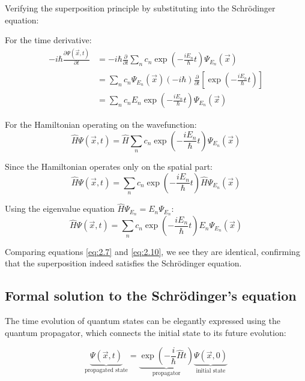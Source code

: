 \documentclass[italian]{HKNdocument}
\begin{document}
Verifying the superposition principle by substituting into the Schrödinger equation:

For the time derivative:
\begin{align}
-i\hbar\frac{\partial\Psi(\vec{x},t)}{\partial t} &= -i\hbar\frac{\partial}{\partial t}\sum_n c_n\exp\left(-\frac{iE_n}{\hbar}t\right)\Psi_{E_n}(\vec{x}) \\
&= \sum_n c_n\Psi_{E_n}(\vec{x})(-i\hbar)\frac{\partial}{\partial t}\left[\exp\left(-\frac{iE_n}{\hbar}t\right)\right] \label{eq:2.7} \\
&= \sum_n c_nE_n\exp\left(-\frac{iE_n}{\hbar}t\right)\Psi_{E_n}(\vec{x})
\end{align}

For the Hamiltonian operating on the wavefunction:
\begin{equation}
\hat{H}\Psi(\vec{x},t) = \hat{H}\sum_n c_n\exp\left(-\frac{iE_n}{\hbar}t\right)\Psi_{E_n}(\vec{x}) \label{eq:2.8}
\end{equation}

Since the Hamiltonian operates only on the spatial part:
\begin{equation}
\hat{H}\Psi(\vec{x},t) = \sum_n c_n\exp\left(-\frac{iE_n}{\hbar}t\right)\hat{H}\Psi_{E_n}(\vec{x}) \label{eq:2.9}
\end{equation}

Using the eigenvalue equation $\hat{H}\Psi_{E_n} = E_n\Psi_{E_n}$:
\begin{equation}
\hat{H}\Psi(\vec{x},t) = \sum_n c_n\exp\left(-\frac{iE_n}{\hbar}t\right)E_n\Psi_{E_n}(\vec{x}) \label{eq:2.10}
\end{equation}

Comparing equations \eqref{eq:2.7} and \eqref{eq:2.10}, we see they are identical, confirming that the superposition indeed satisfies the Schrödinger equation.

\subsection{Formal solution to the Schrödinger's equation}

The time evolution of quantum states can be elegantly expressed using the quantum propagator, which connects the initial state to its future evolution:

\begin{equation}
\underbrace{\Psi(\vec{x},t)}_{\text{propagated state}} = \underbrace{\exp\left(-\frac{i}{\hbar}\hat{H}t\right)}_{\text{propagator}}\underbrace{\Psi(\vec{x},0)}_{\text{initial state}} \label{eq:2.11}
\end{equation}
\end{document}

